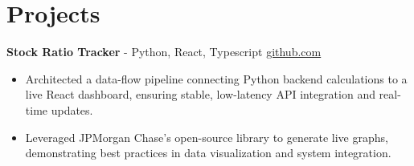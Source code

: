 \documentclass[11pt]{article}       %
\begin{document}

\vspace{-18.5pt}

\section*{Projects}

\textbf{Stock Ratio Tracker}{ - Python, React, Typescript} \hfill \href{https://github.com/Monica20030707/tradingDashboard-UI}{github.com} \\
\vspace{-9pt}
\begin{itemize}
  \item Architected a data-flow pipeline connecting Python backend calculations to a live React dashboard, ensuring stable, low-latency API integration and real-time updates. 
  \item Leveraged JPMorgan Chase’s open-source library to generate live graphs, demonstrating best practices in data visualization and system integration.
\end{itemize}

\end{document}
